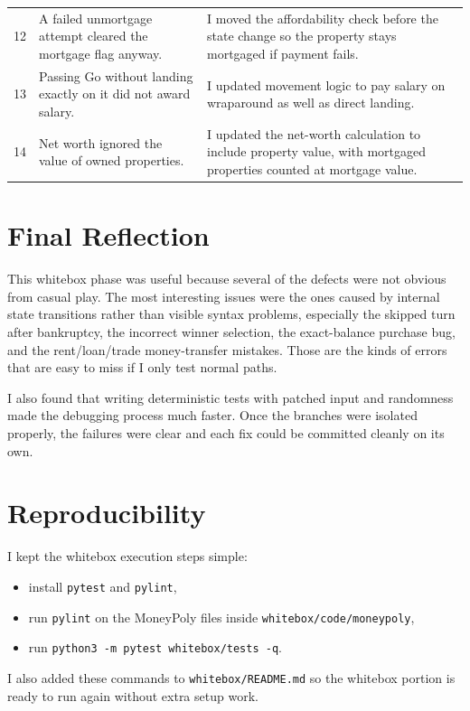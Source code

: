 \documentclass[12pt]{article}
\begin{document}
\begin{longtable}{p{}p{}p{}}
12 & A failed unmortgage attempt cleared the mortgage flag anyway. & I moved the affordability check before the state change so the property stays mortgaged if payment fails. \\
13 & Passing Go without landing exactly on it did not award salary. & I updated movement logic to pay salary on wraparound as well as direct landing. \\
14 & Net worth ignored the value of owned properties. & I updated the net-worth calculation to include property value, with mortgaged properties counted at mortgage value. \\
\bottomrule
\end{longtable}

\section{Final Reflection}
This whitebox phase was useful because several of the defects were not obvious from casual play. The most interesting issues were the ones caused by internal state transitions rather than visible syntax problems, especially the skipped turn after bankruptcy, the incorrect winner selection, the exact-balance purchase bug, and the rent/loan/trade money-transfer mistakes. Those are the kinds of errors that are easy to miss if I only test normal paths.

I also found that writing deterministic tests with patched input and randomness made the debugging process much faster. Once the branches were isolated properly, the failures were clear and each fix could be committed cleanly on its own.

\section{Reproducibility}
I kept the whitebox execution steps simple:

\begin{itemize}
  \item install \texttt{pytest} and \texttt{pylint},
  \item run \texttt{pylint} on the MoneyPoly files inside \texttt{whitebox/code/moneypoly},
  \item run \texttt{python3 -m pytest whitebox/tests -q}.
\end{itemize}

I also added these commands to \texttt{whitebox/README.md} so the whitebox portion is ready to run again without extra setup work.
\end{document}
